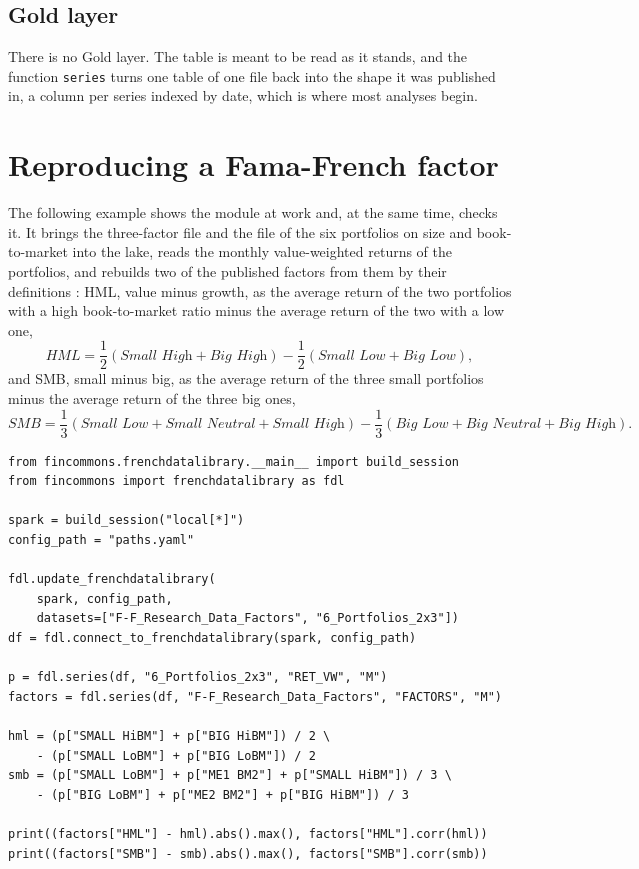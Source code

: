 \subsection{Gold layer}

There is no Gold layer. The table is meant to be read as it stands, and the function \verb|series| turns one table of one file back into the shape it was published in, a column per series indexed by date, which is where most analyses begin.

\section{Reproducing a Fama-French factor}

The following example shows the module at work and, at the same time, checks it. It brings the three-factor file and the file of the six portfolios on size and book-to-market into the lake, reads the monthly value-weighted returns of the portfolios, and rebuilds two of the published factors from them by their definitions \parencite{Fama.1993}: HML, value minus growth, as the average return of the two portfolios with a high book-to-market ratio minus the average return of the two with a low one,
$$HML = \frac{1}{2}\left(\textit{Small High} + \textit{Big High}\right) - \frac{1}{2}\left(\textit{Small Low} + \textit{Big Low}\right),$$
and SMB, small minus big, as the average return of the three small portfolios minus the average return of the three big ones,
$$SMB = \frac{1}{3}\left(\textit{Small Low} + \textit{Small Neutral} + \textit{Small High}\right) - \frac{1}{3}\left(\textit{Big Low} + \textit{Big Neutral} + \textit{Big High}\right).$$

\begin{verbatim}
from fincommons.frenchdatalibrary.__main__ import build_session
from fincommons import frenchdatalibrary as fdl

spark = build_session("local[*]")
config_path = "paths.yaml"

fdl.update_frenchdatalibrary(
    spark, config_path,
    datasets=["F-F_Research_Data_Factors", "6_Portfolios_2x3"])
df = fdl.connect_to_frenchdatalibrary(spark, config_path)

p = fdl.series(df, "6_Portfolios_2x3", "RET_VW", "M")
factors = fdl.series(df, "F-F_Research_Data_Factors", "FACTORS", "M")

hml = (p["SMALL HiBM"] + p["BIG HiBM"]) / 2 \
    - (p["SMALL LoBM"] + p["BIG LoBM"]) / 2
smb = (p["SMALL LoBM"] + p["ME1 BM2"] + p["SMALL HiBM"]) / 3 \
    - (p["BIG LoBM"] + p["ME2 BM2"] + p["BIG HiBM"]) / 3

print((factors["HML"] - hml).abs().max(), factors["HML"].corr(hml))
print((factors["SMB"] - smb).abs().max(), factors["SMB"].corr(smb))
\end{verbatim}

